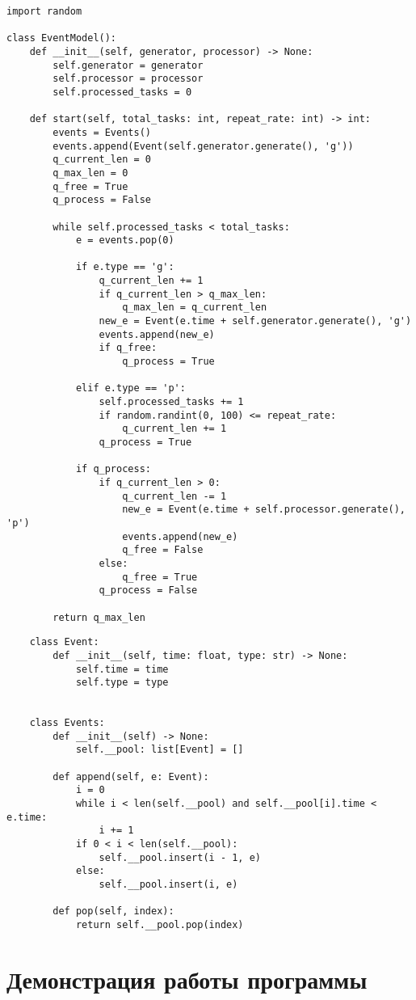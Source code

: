 \clearpage

\begin{lstlisting}
import random 
	
class EventModel():
	def __init__(self, generator, processor) -> None:
		self.generator = generator
		self.processor = processor
		self.processed_tasks = 0

	def start(self, total_tasks: int, repeat_rate: int) -> int:
		events = Events()
		events.append(Event(self.generator.generate(), 'g'))
		q_current_len = 0
		q_max_len = 0
		q_free = True
		q_process = False

		while self.processed_tasks < total_tasks:
			e = events.pop(0)

			if e.type == 'g':
				q_current_len += 1
				if q_current_len > q_max_len:
					q_max_len = q_current_len
				new_e = Event(e.time + self.generator.generate(), 'g')
				events.append(new_e)
				if q_free:
					q_process = True

			elif e.type == 'p':
				self.processed_tasks += 1
				if random.randint(0, 100) <= repeat_rate:
					q_current_len += 1
				q_process = True

			if q_process:
				if q_current_len > 0:
					q_current_len -= 1
					new_e = Event(e.time + self.processor.generate(), 'p')
					events.append(new_e)
					q_free = False
				else:
					q_free = True
				q_process = False
			
		return q_max_len
\end{lstlisting}

\clearpage

\begin{lstlisting}
	class Event:
		def __init__(self, time: float, type: str) -> None:
			self.time = time
			self.type = type
	
	
	class Events:
		def __init__(self) -> None:
			self.__pool: list[Event] = []
		
		def append(self, e: Event):
			i = 0
			while i < len(self.__pool) and self.__pool[i].time < e.time:
				i += 1
			if 0 < i < len(self.__pool):
				self.__pool.insert(i - 1, e)
			else:
				self.__pool.insert(i, e)
			
		def pop(self, index):
			return self.__pool.pop(index)
\end{lstlisting}


\clearpage

\section*{Демонстрация работы программы}

